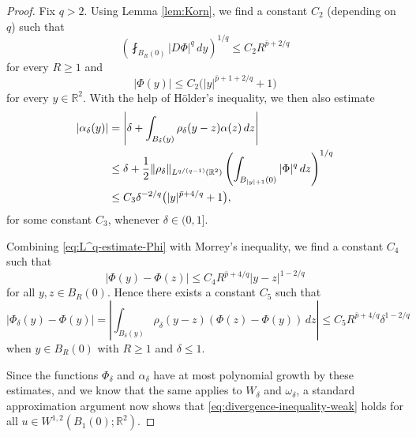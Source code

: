\documentclass[a4paper]{article}
\newcommand{\R}{\mathbb{R}}
\let\div\relax\DeclareMathOperator{\div}{div}
\theoremstyle{definition}
\theoremstyle{remark}
\begin{document}
\begin{proof}
Fix $q > 2$. Using Lemma \ref{lem:Korn}, we find a constant $C_2$ (depending on $q$) such that
\begin{equation} \label{eq:L^q-estimate-Phi}
\left(\fint_{B_R(0)} |D\Phi|^q \, dy\right)^{1/q} \le C_2 R^{\bar{p} + 2/q}
\end{equation}
for every $R \ge 1$ and
\begin{equation} \label{eq:pointwise-estimate-Phi}
|\Phi(y)| \le C_2\bigl(|y|^{\bar{p} + 1+ 2/q} + 1\bigr)
\end{equation}
for every $y \in \R^2$. With the help of H\"older's inequality, we then also estimate
\begin{equation} \label{eq:estimate-alpha_delta}
\begin{split}
|\alpha_\delta(y)| & = \left|\delta + \int_{B_\delta(y)} \rho_\delta(y - z) \alpha(z) \, dz\right| \\
& \le \delta + \frac{1}{2} \|\rho_\delta\|_{L^{q/(q - 1)}(\R^2)} \left(\int_{B_{|y| + 1}(0)} |\div \Phi|^q \, dz\right)^{1/q} \\
& \le C_3 \delta^{-2/q} \bigl(|y|^{\bar{p} + 4/q} + 1\bigr),
\end{split}
\end{equation}
for some constant $C_3$, whenever $\delta \in (0, 1]$.

Combining \eqref{eq:L^q-estimate-Phi} with Morrey's inequality, we find a constant $C_4$ such that
\[
|\Phi(y) - \Phi(z)| \le C_4 R^{\bar{p} + 4/q} |y - z|^{1 - 2/q}
\]
for all $y, z \in B_R(0)$. Hence there exists a constant $C_5$ such that
\begin{equation} \label{eq:convergence-rate-Phi_delta}
|\Phi_\delta(y) - \Phi(y)| = \left|\int_{B_\delta(y)} \rho_\delta(y - z) (\Phi(z) - \Phi(y)) \, dz\right| \le C_5 R^{\bar{p} + 4/q} \delta^{1 - 2/q}
\end{equation}
when $y \in B_R(0)$ with $R \ge 1$ and $\delta \le 1$.

Since the functions $\Phi_\delta$ and $\alpha_\delta$ have at most polynomial growth by these
estimates, and we know that the same applies to $W_\delta$ and $\omega_\delta$, a standard
approximation argument now shows that \eqref{eq:divergence-inequality-weak}
holds for all $u \in W^{1, 2}(B_1(0); \R^2)$.


\end{proof}
\end{document}
